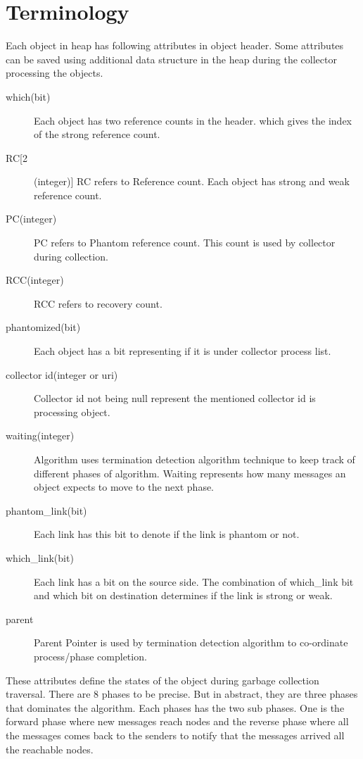 \documentclass{article}
\begin{document}
\section{Terminology}
Each object in heap has following attributes in object header. Some attributes can be saved using additional data structure in the heap during the collector processing the objects. 
\begin{description}
  \item[which(bit)] Each object has two reference counts in the header. which gives the index of the strong reference count.
  \item[RC[2](integer)] RC refers to Reference count. Each object has strong and weak reference count.
  \item[PC(integer)] PC refers to Phantom reference count. This count is used by collector during collection.
  \item[RCC(integer)] RCC refers to recovery count.
  \item[phantomized(bit)] Each object has a bit representing if it is under collector process list.
  \item[collector id(integer or uri)] Collector id not being null represent the mentioned collector id is processing object.
  \item[waiting(integer)] Algorithm uses termination detection algorithm technique to keep track of different phases of algorithm. Waiting represents how many messages an object expects to move to the next phase.
  \item[phantom\_link(bit)] Each link has this bit to denote if the link is phantom or not.
  \item[which\_link(bit)] Each link has a bit on the source side. The combination of which\_link bit and which bit on destination determines if the link is strong or weak.
\item[parent] Parent Pointer is used by termination detection algorithm to co-ordinate process/phase completion.
\end{description}
These attributes define the states of the object during garbage collection traversal. There are 8 phases to be precise. But in abstract, they are three phases that dominates the algorithm. Each phases has the two sub phases. One is the forward phase where new messages reach nodes and the reverse phase where all the messages comes back to the senders to notify that the messages arrived all the reachable nodes. 
\end{document}
